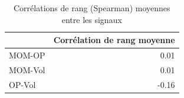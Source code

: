 \begin{table}[htbp]
\centering
\small
\caption{Corrélations de rang (Spearman) moyennes entre les signaux}
\label{tab:T1b_correlations}
\begin{tabular}{lr}
\toprule
 & Corrélation de rang moyenne \\
\midrule
MOM-OP & 0.01 \\
MOM-Vol & 0.01 \\
OP-Vol & -0.16 \\
\bottomrule
\end{tabular}
\end{table}